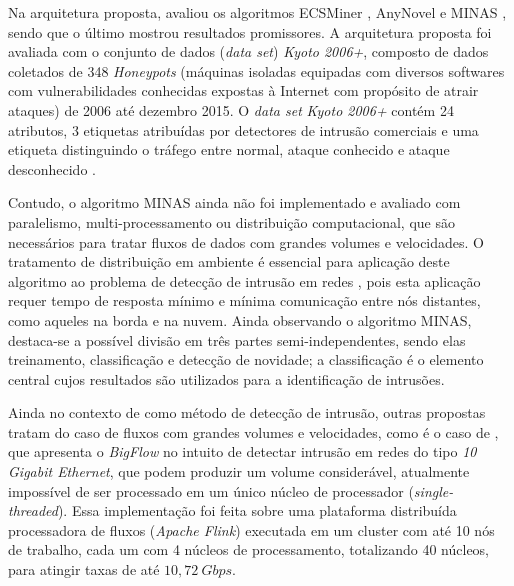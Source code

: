 Na arquitetura proposta,  avaliou os algoritmos
ECSMiner \cite{Masud2010ECSMiner}, AnyNovel \cite{Abdallah2016anynovel} e MINAS
\cite{Faria2015minas}, sendo que o último mostrou resultados promissores.
A arquitetura proposta foi avaliada com o conjunto de dados (\emph{data set})
\emph{Kyoto 2006+}, composto de dados coletados de 348 \emph{Honeypots}
(máquinas isoladas equipadas com diversos softwares com vulnerabilidades
conhecidas expostas à Internet com propósito de atrair ataques) de 2006 até
dezembro 2015.
O \emph{data set} \emph{Kyoto 2006+} contém 24 atributos, 3 etiquetas atribuídas por
detectores de intrusão comerciais e uma etiqueta
distinguindo o tráfego entre normal, ataque conhecido e ataque desconhecido
\cite{Cassales2019a}.

Contudo, o algoritmo MINAS ainda não foi implementado e avaliado com paralelismo,
multi-processamento ou distribuição computacional, que são necessários para
tratar fluxos de dados com grandes volumes e velocidades.
O tratamento de distribuição em ambiente \fog é essencial para aplicação deste
algoritmo ao problema de detecção de intrusão em redes \iot, pois esta aplicação
requer tempo de resposta mínimo e mínima comunicação entre nós distantes, como
aqueles na borda e na nuvem.
Ainda observando o algoritmo MINAS, destaca-se a possível divisão em três partes
semi-independentes, sendo elas treinamento, classificação e detecção de
novidade; a classificação é o elemento central cujos resultados são utilizados
para a identificação de intrusões.

Ainda no contexto de \nd como método de detecção de intrusão,
outras propostas tratam do caso de fluxos com grandes volumes e velocidades, como é o caso
de , que apresenta o \emph{BigFlow} no intuito de detectar
intrusão em redes do tipo \emph{10 Gigabit Ethernet}, que podem produzir um volume considerável,
atualmente impossível de ser processado em um único núcleo de processador
(\emph{single-threaded}).
Essa implementação foi feita sobre uma plataforma
distribuída processadora de fluxos (\emph{Apache Flink}) executada em um cluster
com até 10 nós de trabalho, cada um com 4 núcleos de processamento, totalizando
40 núcleos, para atingir taxas de até $10,72 \ Gbps$.

